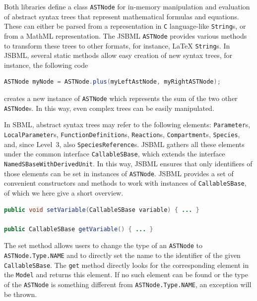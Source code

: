 Both libraries define a class \texttt{ASTNode}
for in-memory manipulation and evaluation of abstract syntax trees that represent
mathematical formulas and equations. These can either be parsed from a representation in \texttt{C}
language-like \texttt{String}s, or from a MathML representation. The JSBML
\texttt{ASTNode} provides various methods to transform these trees to other
formats, for instance, \LaTeX{}
 \texttt{String}s. In JSBML, several static
methods allow easy creation of new syntax trees, for instance, the following
code
\begin{lstlisting}[language=Java,numbers=none]
ASTNode myNode = ASTNode.plus(myLeftAstNode, myRightASTNode);
\end{lstlisting}
creates a new instance of \texttt{ASTNode} which represents the sum of the two
other \texttt{ASTNode}s. In this way, even complex trees can be easily
manipulated.

In SBML, abstract syntax trees may refer to the following elements:
\texttt{Parameter}s, \texttt{LocalParameter}s, \texttt{FunctionDefinition}s,
\texttt{Reaction}s, \texttt{Compartment}s, \texttt{Species}, and, since Level~3,
also \texttt{SpeciesReference}s. JSBML gathers all these elements under the
common interface \texttt{CallableSBase},
%
%
which extends the interface \texttt{NamedSBaseWithDerivedUnit}.
%
%
In this way, JSBML ensures that only identifiers of those elements can be set in
instances of \texttt{ASTNode}.
%
JSBML provides a set of convenient constructors and methods to work with
instances of \texttt{CallableSBase},
%
%
of which we here give a short overview.
\begin{lstlisting}[language=Java,numbers=none,float=h,captionpos=t,
title={Getter and setter:}]
public void setVariable(CallableSBase variable) { ... }

public CallableSBase getVariable() { ... }
\end{lstlisting}
The set method allows users to change the type of an \texttt{ASTNode} to
\texttt{ASTNode.Type.NAME}
%
and to directly set the name to the identifier of the
given \texttt{CallableSBase}.
%
%
The \texttt{get} method directly looks for the corresponding element in the
\texttt{Model}%
and returns this element. If no such element can be found or the type of the
\texttt{ASTNode} is something different from \texttt{ASTNode.Type.NAME}, an
%
%
exception will be thrown.

